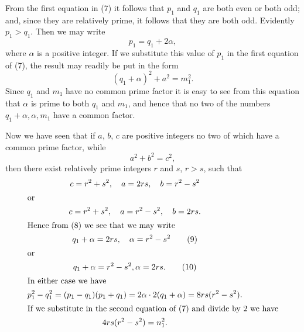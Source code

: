 \documentclass[oneside]{book}
\begin{document}
From the first equation in (7) it follows that $p_1$ and $q_1$ are
both even or both odd; and, since they are relatively prime, it
follows that they are both odd. Evidently $p_1 > q_1$. Then we may
write
\begin{equation*}
p_1 = q_1 + 2\alpha,
\end{equation*}
where $\alpha$ is a positive integer. If we substitute this value of
$p_1$ in the first equation of (7), the result may readily be put in
the form
\begin{equation}
(q_1 + \alpha)^2 + a^2 = m_1^2. \tag{8}
\end{equation}
Since $q_1$ and $m_1$ have no common prime factor it is easy to see
from this equation that $\alpha$ is prime to both $q_1$ and $m_1$,
and hence that no two of the numbers $q_1 + \alpha, \alpha, m_1$
have a common factor.

Now we have seen that if $a$, $b$, $c$ are positive integers no two
of which have a common prime factor, while
\begin{equation*}
a^2 + b^2 = c^2,
\end{equation*}
then there exist relatively prime integers $r$ and $s$, $r > s$,
such that
\begin{gather}
c = r^2 + s^2,\quad a = 2rs,\quad b = r^2 - s^2 \notag \\
\intertext{or}
c = r^2 + s^2,\quad a = r^2 - s^2,\quad b = 2rs. \notag \\
\intertext{Hence from (8) we see that we may write}
q_1 + \alpha = 2rs,\quad \alpha = r^2 - s^2 \tag{9} \\
\intertext{or}
q_1 + \alpha = r^2 - s^2, \alpha = 2rs. \tag{10} \\
\intertext{In either case we have}
p_1^2 - q_1^2 = (p_1 - q_1)(p_1 + q_1) =
  2\alpha \cdot 2(q_1 + \alpha) = 8rs(r^2 - s^2). \notag \\
\intertext{If we substitute in the second equation of (7) and divide
by 2 we have} 4rs(r^2 - s^2) = n_1^2. \notag
\end{gather}
\end{document}
